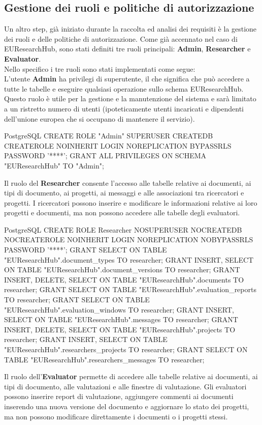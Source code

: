 \documentclass{report}
\begin{document}
\subsection{Gestione dei ruoli e politiche di autorizzazione}
Un altro step, già iniziato durante la raccolta ed analisi dei requisiti è la gestione dei ruoli e delle politiche di autorizzazione. Come già accennato nel caso di EUResearchHub, sono stati definiti tre ruoli principali: \textbf{Admin}, \textbf{Researcher} e \textbf{Evaluator}. \\
Nello specifico i tre ruoli sono stati implementati come segue:\\
L'utente \textbf{Admin} ha privilegi di superutente, il che significa che può accedere a tutte le tabelle e eseguire qualsiasi operazione sullo schema EUResearchHub. Questo ruolo è utile per la gestione e la manutenzione del sistema e sarà  limitato a un ristretto numero di utenti (ipoteticamente utenti incaricati e dipendenti dell'unione europea che si occupano di mantenere il servizio).
\begin{imtaCode}{PostgreSQL}
CREATE ROLE "Admin" SUPERUSER CREATEDB CREATEROLE NOINHERIT LOGIN NOREPLICATION BYPASSRLS PASSWORD '****';
GRANT ALL PRIVILEGES ON SCHEMA "EUResearchHub" TO "Admin";
\end{imtaCode}
Il ruolo del \textbf{Researcher} consente l'accesso alle tabelle relative ai documenti, ai tipi di documento, ai progetti, ai messaggi e alle associazioni tra ricercatori e progetti. I ricercatori possono inserire e modificare le informazioni relative ai loro progetti e documenti, ma non possono accedere alle tabelle degli evaluatori.
\begin{imtaCode}{PostgreSQL}
CREATE ROLE Researcher NOSUPERUSER NOCREATEDB NOCREATEROLE NOINHERIT LOGIN NOREPLICATION NOBYPASSRLS PASSWORD '****';
GRANT SELECT ON TABLE "EUResearchHub".document_types TO researcher;
GRANT INSERT, SELECT ON TABLE "EUResearchHub".document_versions TO researcher;
GRANT INSERT, DELETE, SELECT ON TABLE "EUResearchHub".documents TO researcher;
GRANT SELECT ON TABLE "EUResearchHub".evaluation_reports TO researcher;
GRANT SELECT ON TABLE "EUResearchHub".evaluation_windows TO researcher;
GRANT INSERT, SELECT ON TABLE "EUResearchHub".messages TO researcher;
GRANT INSERT, DELETE, SELECT ON TABLE "EUResearchHub".projects TO researcher;
GRANT INSERT, SELECT ON TABLE "EUResearchHub".researchers_projects TO researcher;
GRANT SELECT ON TABLE "EUResearchHub".researchers_messages TO researcher;
\end{imtaCode}
Il ruolo dell'\textbf{Evaluator} permette di accedere alle tabelle relative ai documenti, ai tipi di documento, alle valutazioni e alle finestre di valutazione. Gli evaluatori possono inserire report di valutazione, aggiungere commenti  ai documenti inserendo una nuova versione del documento e aggiornare lo stato dei progetti, ma non possono modificare direttamente i documenti o i progetti stessi.
\end{document}
